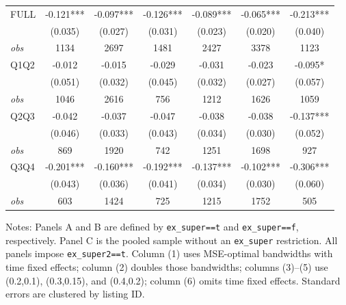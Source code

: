 \begin{table}[!htbp]
\begin{tabular}{lcccccc}
FULL & -0.121*** & -0.097*** & -0.126*** & -0.089*** & -0.065*** & -0.213*** \\
 & (0.035) & (0.027) & (0.031) & (0.023) & (0.020) & (0.040) \\
\textit{obs} & 1134 & 2697 & 1481 & 2427 & 3378 & 1123 \\
Q1Q2 & -0.012 & -0.015 & -0.029 & -0.031 & -0.023 & -0.095* \\
 & (0.051) & (0.032) & (0.045) & (0.032) & (0.027) & (0.057) \\
\textit{obs} & 1046 & 2616 & 756 & 1212 & 1626 & 1059 \\
Q2Q3 & -0.042 & -0.037 & -0.047 & -0.038 & -0.038 & -0.137*** \\
 & (0.046) & (0.033) & (0.043) & (0.034) & (0.030) & (0.052) \\
\textit{obs} & 869 & 1920 & 742 & 1251 & 1698 & 927 \\
Q3Q4 & -0.201*** & -0.160*** & -0.192*** & -0.137*** & -0.102*** & -0.306*** \\
 & (0.043) & (0.036) & (0.041) & (0.034) & (0.030) & (0.060) \\
\textit{obs} & 603 & 1424 & 725 & 1215 & 1752 & 505 \\
\bottomrule
\end{tabular}
\begin{minipage}{0.98\textwidth}\footnotesize
Notes: Panels A and B are defined by \texttt{ex\_super==t} and \texttt{ex\_super==f}, respectively. Panel C is the pooled sample without an \texttt{ex\_super} restriction. All panels impose \texttt{ex\_super2==t}. Column (1) uses MSE-optimal bandwidths with time fixed effects; column (2) doubles those bandwidths; columns (3)--(5) use (0.2,0.1), (0.3,0.15), and (0.4,0.2); column (6) omits time fixed effects. Standard errors are clustered by listing ID.
\end{minipage}
\end{table}
